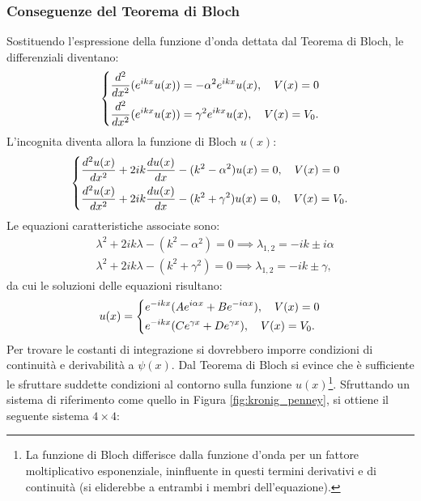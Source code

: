 \documentclass[a4paper,11pt]{report}
\begin{document}
\subsubsection{Conseguenze del Teorema di Bloch}
Sostituendo l'espressione della funzione d'onda dettata dal Teorema di Bloch, le differenziali diventano:
\begin{equation}
\begin{dcases}
\frac{d^2}{dx^2}(e^{ikx} u(x)) = -\alpha^2e^{ikx} u(x), \quad V(x) = 0 \\
\frac{d^2}{dx^2}(e^{ikx} u(x)) = \gamma^2e^{ikx} u(x), \quad V(x) = V_0.
\end{dcases}
\end{equation}
L'incognita diventa allora la funzione di Bloch $u(x)$:
\begin{equation}
\begin{dcases}
\frac{d^2 u(x)}{dx^2} +2ik\frac{du(x)}{dx} -(k^2-\alpha^2)u(x)= 0, \quad V(x) = 0 \\
\frac{d^2 u(x)}{dx^2} +2ik\frac{du(x)}{dx} -(k^2+\gamma^2)u(x)= 0, \quad V(x) = V_0.
\end{dcases}
\end{equation}
Le equazioni caratteristiche associate sono:
\begin{equation}
\begin{aligned}
&\lambda^2 +2ik \lambda - (k^2-\alpha^2) = 0 \implies \lambda_{1,2} = -ik\pm i\alpha \\
&\lambda^2 +2ik \lambda - (k^2+\gamma^2) = 0 \implies \lambda_{1,2} = -ik\pm \gamma,
\end{aligned}
\end{equation}
da cui le soluzioni delle equazioni risultano:
\begin{equation}
u(x) =
\begin{dcases}
e^{-ikx}(Ae^{i\alpha x} + Be^{-i\alpha x}), \quad V(x) = 0 \\
e^{-ikx}(Ce^{\gamma x} + De^{\gamma x}), \quad V(x) = V_0.
\end{dcases}
\end{equation}
Per trovare le costanti di integrazione si dovrebbero imporre condizioni di continuità e derivabilità a $\psi(x)$. Dal Teorema di Bloch si evince che è sufficiente le sfruttare suddette condizioni al contorno sulla funzione $u(x)$\footnote{La funzione di Bloch differisce dalla funzione d'onda per un fattore moltiplicativo esponenziale, ininfluente in questi termini derivativi e di continuità (si eliderebbe a entrambi i membri dell'equazione).}. Sfruttando un sistema di riferimento come quello in Figura \eqref{fig:kronig_penney}, si ottiene il seguente sistema $4\times 4$:
\end{document}
